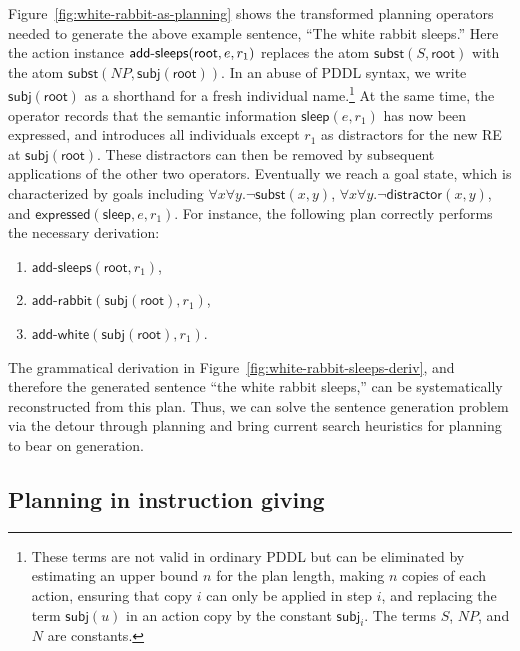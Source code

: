 Figure~\ref{fig:white-rabbit-as-planning} shows the
transformed planning operators needed to generate the above example
sentence, ``The white rabbit sleeps.'' Here the action instance
$\mathsf{add}\textsf{-}\mathsf{sleeps}(\mathsf{root}, e, r_1)$ replaces the atom
$\mathsf{subst}(S,\mathsf{root})$ with the atom
$\mathsf{subst}(NP,\mathsf{subj}(\mathsf{root}))$. In an abuse of PDDL
syntax, we write $\mathsf{subj}(\mathsf{root})$ as a shorthand for a fresh
individual name.\footnote{These terms are not valid in
  ordinary PDDL but can be eliminated by estimating an upper bound $n$
  for the plan length, making $n$ copies of each action, ensuring that
  copy $i$ can only be applied in step $i$, and replacing the term
  $\mathsf{subj}(u)$ in an action copy by the constant
  $\mathsf{subj}_i$. The terms $S$, $NP$, and $N$ are constants.}
At the same time, the operator records that
the semantic information $\mathsf{sleep}(e,r_1)$ has now been
expressed, and introduces all individuals except $r_1$ as
distractors for the new RE at $\mathsf{subj}(\mathsf{root})$. These
distractors can then be removed by subsequent applications of the
other two operators. Eventually we reach a goal state, which is
characterized by goals including $\forall x \forall y. \neg
\mathsf{subst}(x,y)$, $\forall x \forall y. \neg
\mathsf{distractor}(x,y)$, and
$\mathsf{expressed}(\mathsf{sleep},e,r_1)$. For instance, the following
plan correctly performs the necessary derivation:
%
\begin{enumerate}
\item $\mathsf{add}\textsf{-}\mathsf{sleeps}(\mathsf{root}, r_1)$,
\item $\mathsf{add}\textsf{-}\mathsf{rabbit}(\mathsf{subj}(\mathsf{root}),r_1)$,
\item $\mathsf{add}\textsf{-}\mathsf{white}(\mathsf{subj}(\mathsf{root}),r_1)$.
\end{enumerate}
%
The grammatical derivation in
Figure~\ref{fig:white-rabbit-sleeps-deriv}, and therefore the
generated sentence ``the white rabbit sleeps,'' can be systematically
reconstructed from this plan. Thus, we can solve the sentence
generation problem via the detour through planning and bring current
search heuristics for planning to bear on generation.


\subsection{Planning in instruction giving}
\label{sec:domain-give}

